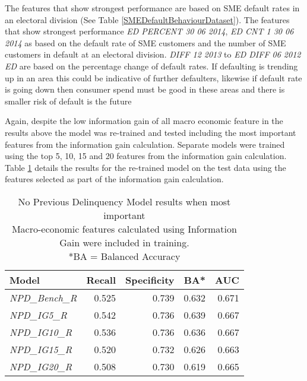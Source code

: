 The features that show strongest performance are based on SME default rates in an electoral division (See Table \ref{SMEDefaultBehaviourDataset}). The features that show strongest performance \textit{ED PERCENT 30 06 2014}, \textit{ED CNT 1 30 06 2014} as based on the default rate of SME customers and the number of SME customers in default at an electoral division. \textit{DIFF 12 2013} to \textit{ED DIFF 06 2012 ED} are based on the percentage change of default rates.  If defaulting is trending up in an area this could be indicative of further defaulters, likewise if default rate is going down then consumer spend must be good in these areas and there is smaller risk of default is the future

Again, despite the low information gain of all macro economic feature in the results above the model was re-trained and tested including the most important features from the information gain calculation. Separate models were trained using the top 5, 10, 15 and 20 features from the information gain calculation. Table \ref{table:InfoGainNPDModelResults} details the results for the re-trained model on the test data using the features selected as part of the information gain calculation.


\begin{table}[H]
\centering
\small
		\begin{tabular}{l r r r r}
			\hline
			\textbf{Model} & \textbf{Recall} & \textbf{Specificity} & \textbf{BA*} & \textbf{AUC}  \\ \hline
			\textit{NPD\_Bench\_R} & 0.525 & \cellcolor{green!25}0.739 & 0.632 & \cellcolor{green!25}0.671   \\ \hline
			\textit{NPD\_IG5\_R} & \cellcolor{green!25}0.542 & 0.736 & \cellcolor{green!25}0.639 & 0.667   \\ 
			\textit{NPD\_IG10\_R} & 0.536 & 0.736 & 0.636 & 0.667  \\ 
			\textit{NPD\_IG15\_R} & 0.520 & 0.732 & 0.626 & 0.663 \\
			\textit{NPD\_IG20\_R} &  0.508 & 0.730 & 0.619 & 0.665  \\\hline 
		\end{tabular}
	\caption{No Previous Delinquency Model results when most important \\Macro-economic features calculated using Information Gain were included in training.\\
		*BA = Balanced Accuracy}
	\label{table:InfoGainNPDModelResults}
\end{table}

